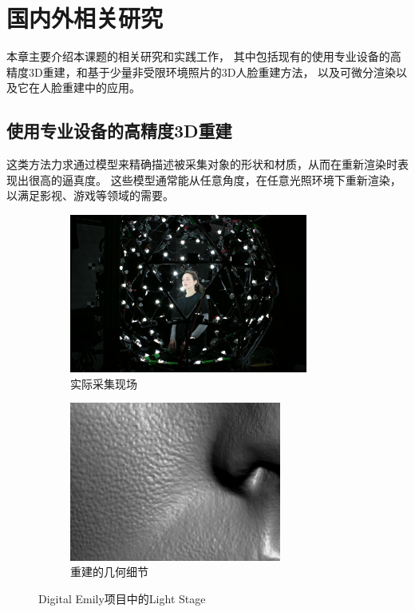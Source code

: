 \chapter{国内外相关研究}
\label{chap:related_work}

本章主要介绍本课题的相关研究和实践工作，
其中包括现有的使用专业设备的高精度3D重建，和基于少量非受限环境照片的3D人脸重建方法，
以及可微分渲染以及它在人脸重建中的应用。

\section{使用专业设备的高精度3D重建}

这类方法力求通过模型来精确描述被采集对象的形状和材质，从而在重新渲染时表现出很高的逼真度。
这些模型通常能从任意角度，在任意光照环境下重新渲染，以满足影视、游戏等领域的需要。

\begin{figure}[t]
\centering
\begin{subfigure}[b]{0.53\textwidth}
    \centering
    \includegraphics[height=148pt]{figures/light_stage}
    \caption{实际采集现场}
\end{subfigure}%
\begin{subfigure}[b]{0.47\textwidth}
    \centering
    \includegraphics[height=148pt]{figures/emily_detail_1}
    \caption{重建的几何细节}
\end{subfigure}
\caption[Digital Emily 项目中的 Light Stage]{Digital Emily项目中的Light Stage\cite{DEP}}
\end{figure}

